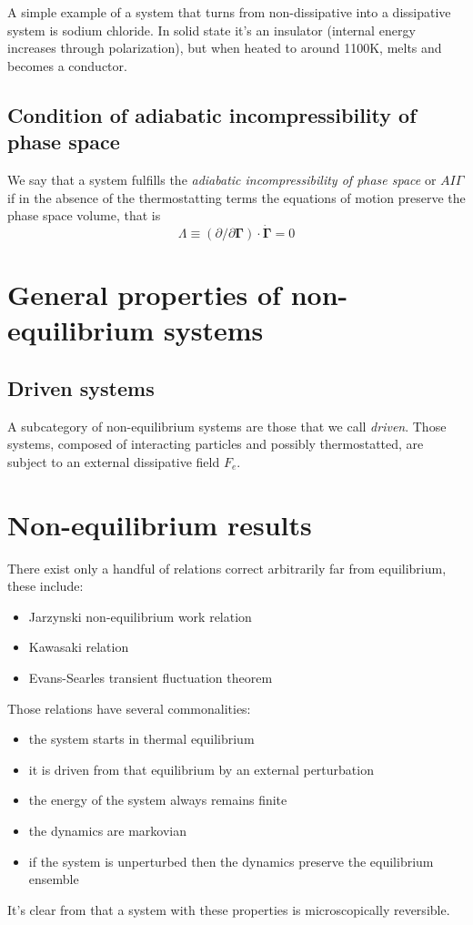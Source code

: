 \documentclass[a4paper,12pt,nofootinbib]{article}
\begin{document}
A simple example of a system that turns from non-dissipative into a dissipative system is sodium chloride. In solid state it's an insulator (internal energy increases through polarization), but when heated to around 1100K, melts and becomes a conductor.

\subsection{Condition of adiabatic incompressibility of phase space}

We say that a system fulfills the \textit{adiabatic incompressibility of phase space} or $AI\Gamma$ if in the absence of the thermostatting terms the equations of motion preserve the phase space volume, that is
\begin{equation}
  \Lambda \equiv (\partial / \partial\bm{\Gamma}) \cdot \dot{\bm{\Gamma}}=0
\end{equation}

\section{General properties of non-equilibrium systems}

\subsection{Driven systems}

A subcategory of non-equilibrium systems are those that we call \textit{driven}.
Those systems, composed of interacting particles and possibly thermostatted, are subject to an external dissipative field $F_e$.


\section{Non-equilibrium results}
There exist only a handful of relations correct arbitrarily far from equilibrium, these include:
\begin{itemize}
  \item Jarzynski non-equilibrium work relation
  \item Kawasaki relation
  \item Evans-Searles transient fluctuation theorem
\end{itemize}
Those relations have several commonalities:
\begin{itemize}
  \item the system starts in thermal equilibrium
  \item it is driven from that equilibrium by an external perturbation
  \item the energy of the system always remains finite
  \item the dynamics are markovian 
  \item if the system is unperturbed then the dynamics preserve the equilibrium ensemble
\end{itemize}
It's clear from that a system with these properties is microscopically reversible.
\end{document}
